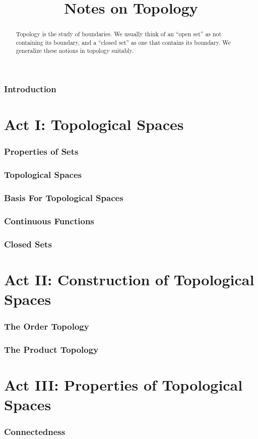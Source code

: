 \documentclass[oneside]{amsart}
\title{Notes on Topology}
\numberwithin{equation}{section}
\begin{document}
\begin{abstract}
Topology is the study of boundaries. We usually think of an ``open
set'' as not containing its boundary, and a ``closed set'' as one that
contains its boundary. We generalize these notions in topology
suitably. 
\end{abstract}
\maketitle
\tableofcontents
\section{Introduction}

\part{Act I: Topological Spaces}
\section{Properties of Sets}

\section{Topological Spaces}

\section{Basis For Topological Spaces}

\section{Continuous Functions}

\section{Closed Sets}

\part{Act II: Construction of Topological Spaces}
\section{The Order Topology}

\section{The Product Topology}

\part{Act III: Properties of Topological Spaces}
\section{Connectedness}


\nocite{munkres,mccluskeyMcMaster,morris}


\end{document}
